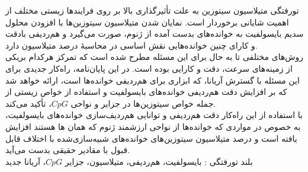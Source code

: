 


\pagestyle{empty}

‌تورفتگی
متیلاسیون سیتوزین به علت تأثیرگذاری بالا بر روی فرایندها زیستی مختلف از اهمیت شایانی برخوردار است. نمایان شدن متیلاسیون سیتوزین‌ها با افزودن محلول سدیم بایسولفیت به خوانده‌های بدست آمده از ژنوم، صورت می‌گیرد و هم‌ردیفی بادقت و کارای چنین خوانده‌هایی نقش اساسی در محاسبهٔ درصد متیلاسیون دارد.\\
روش‌های مختلفی تا به حال برای این مسئله مطرح شده است که تمرکز هرکدام بریکی از زمینه‌های سرعت، دقت و کارایی بوده است. در این پایان‌نامه، راه‌کار جدیدی برای این مسئله با گسترش آریانا، که ابزاری برای هم‌ردیفی خوانده‌ها است، ارائه خواهد شد که بر افزایش دقت هم‌ردیفی خوانده‌های بایسولفیت و استفاده از خواص زیستی از جمله خواص سیتوزین‌ها در جزایر و نواحی $CpG$، تأکید می‌کند.\\
با استفاده از این راه‌کار دقت هم‌ردیفی و توانایی هم‌ردیف‌سازی خوانده‌های بایسولفیت، به خصوص در مواردی که خوانده‌ها از نواحی ارزشمند ژنوم که همان ها هستند افزایش یافته است و درصد متیلاسیون سیتوزین‌های خوانده‌های شبیه‌سازی‌شده با اختلاف قابل قبول با مقادیر حقیقی بدست می‌آید.\\
‌بلند
‌تورفتگی : 
بایسولفیت، هم‌ردیفی، متیلاسیون، جزایر $CpG$، آریانا 
‌جدید
